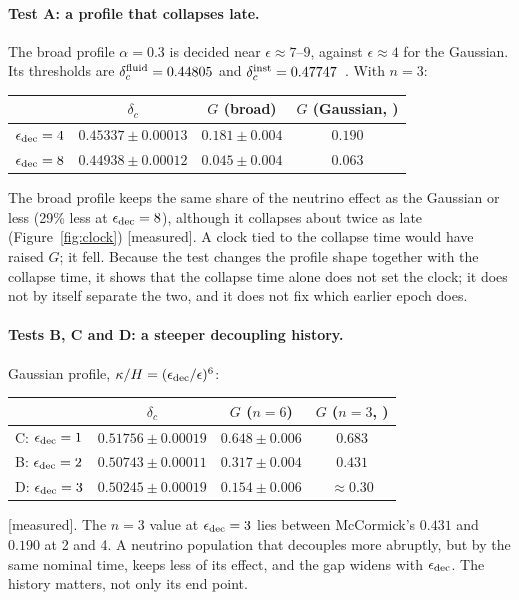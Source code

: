 \documentclass[11pt]{article}
\newcommand{\grade}[1]{\textsf{\small[#1]}}
\begin{document}
\paragraph{Test A: a profile that collapses late.} The broad profile $\alpha=0.3$ is decided near $\epsilon\approx7$--$9$, against $\epsilon\approx4$ for the Gaussian. Its thresholds are $\delta_c^{\rm fluid}=0.44805$ and $\delta_c^{\rm inst}=0.47747$~\cite{McCcode}. With $n=3$:
\begin{center}\begin{tabular}{lccc}\toprule
& $\delta_c$ & $G$ (broad) & $G$ (Gaussian, \cite{McC}) \\\midrule
$\epsilon_{\rm dec}=4$ & $0.45337\pm0.00013$ & $0.181\pm0.004$ & $0.190$\\
$\epsilon_{\rm dec}=8$ & $0.44938\pm0.00012$ & $0.045\pm0.004$ & $0.063$\\\bottomrule\end{tabular}\end{center}
The broad profile keeps the same share of the neutrino effect as the Gaussian or less (29\% less at $\epsilon_{\rm dec}=8$), although it collapses about twice as late (Figure~\ref{fig:clock}) \grade{measured}. A clock tied to the collapse time would have raised $G$; it fell. Because the test changes the profile shape together with the collapse time, it shows that the collapse time alone does not set the clock; it does not by itself separate the two, and it does not fix which earlier epoch does.

\paragraph{Tests B, C and D: a steeper decoupling history.} Gaussian profile, $\kappa/H=(\epsilon_{\rm dec}/\epsilon)^6$:
\begin{center}\begin{tabular}{lccc}\toprule
& $\delta_c$ & $G$ ($n=6$) & $G$ ($n=3$, \cite{McC}) \\\midrule
C: $\epsilon_{\rm dec}=1$ & $0.51756\pm0.00019$ & $0.648\pm0.006$ & $0.683$\\
B: $\epsilon_{\rm dec}=2$ & $0.50743\pm0.00011$ & $0.317\pm0.004$ & $0.431$\\
D: $\epsilon_{\rm dec}=3$ & $0.50245\pm0.00019$ & $0.154\pm0.006$ & $\approx0.30$\\\bottomrule\end{tabular}\end{center}
\grade{measured}. The $n=3$ value at $\epsilon_{\rm dec}=3$ lies between McCormick's $0.431$ and $0.190$ at 2 and 4. A neutrino population that decouples more abruptly, but by the same nominal time, keeps less of its effect, and the gap widens with $\epsilon_{\rm dec}$. The history matters, not only its end point.
\end{document}
